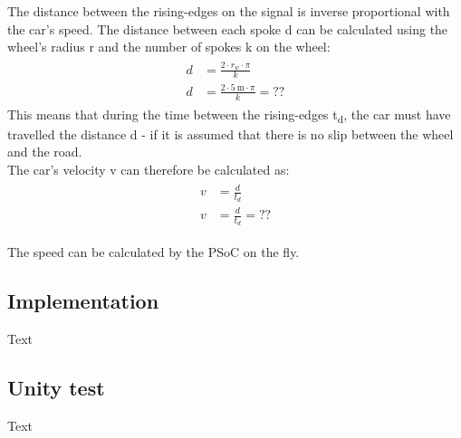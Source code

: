 The distance between the rising-edges on the signal is inverse proportional with the car's speed. The distance between each spoke d can be calculated using the wheel's radius r and the number of spokes k on the wheel:
\begin{align}
	\begin{split}
		d &= \frac{2 \cdot r_w \cdot \pi}{k}\\
		d &= \frac{2 \cdot \SI{5}{\meter} \cdot \pi}{k} = ??
	\end{split}
\end{align}
This means that during the time between the rising-edges t\textsubscript{d}, the car must have travelled the distance d - if it is assumed that there is no slip between the wheel and the road.\\
The car's velocity v can therefore be calculated as:
\begin{align}
	\begin{split}
		v &= \frac{d}{t_d}\\
		v &= \frac{d}{t_d} = ??
	\end{split}
\end{align}

The speed can be calculated by the PSoC on the fly.

\subsection{Implementation}
Text

\subsection{Unity test}
Text